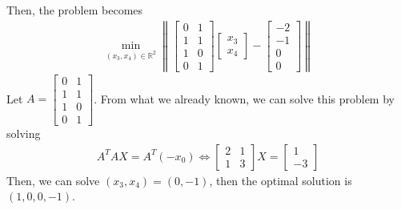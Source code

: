\documentclass[11pt,a4paper]{article}
\begin{document}
Then, the problem becomes
\begin{equation}
    \begin{aligned}
        \min_{(x_3,x_4)\in \mathbb{R}^2}\left\|\begin{bmatrix}
            0&1\\1&1\\1&0\\0&1
        \end{bmatrix}\begin{bmatrix}
            x_3\\x_4
        \end{bmatrix}-\begin{bmatrix}
            -2\\-1\\0\\0
        \end{bmatrix}\right\|
    \end{aligned}
    \nonumber
\end{equation}
Let $A=\begin{bmatrix}
    0&1\\1&1\\1&0\\0&1
\end{bmatrix}$. From what we already known, we can solve this problem by solving
\begin{equation}
    \begin{aligned}
        A^TAX=A^T(-x_0)\Leftrightarrow \begin{bmatrix}
            2&1\\
            1&3
        \end{bmatrix}X=\begin{bmatrix}
            1\\
            -3
        \end{bmatrix}
    \end{aligned}
    \nonumber
\end{equation}
Then, we can solve $(x_3,x_4)=(0,-1)$, then the optimal solution is $(1,0,0,-1)$.
\end{document}
